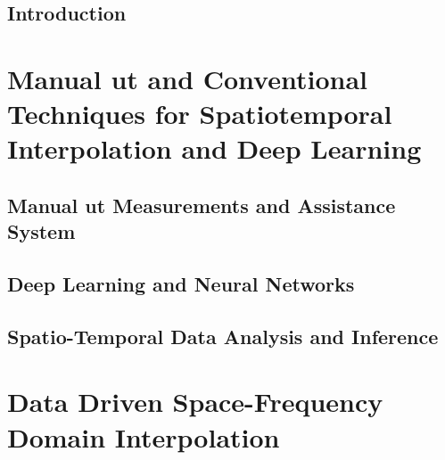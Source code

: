 \documentclass[		a4paper,
								oneside,
								11pt,
								headinclude,
								BCOR=17mm,        %
								headsepline,     %
								footsepline,
								]{scrreprt}%
\begin{document}

 


\tableofcontents 
{}

\listoffigures
{}
\listoftables
{}

\newpage %
\setcounter{page}{1} 



\chapter{Introduction} \label{chap:intro}


\part[Data Model and SoA]{Manual \acrshort{ut} and Conventional Techniques for Spatiotemporal Interpolation and Deep Learning} \label{part_soa} 
\chapter[UT Data Model]{Manual \acrshort{ut} Measurements and Assistance System} \label{chap_ut} 


\chapter[SoA: DL]{Deep Learning and Neural Networks} \label{chap_dl}


\chapter[SoA: ST Interpolation]{Spatio-Temporal Data Analysis and Inference} \label{chap_stitp} 



\part{Data Driven Space-Frequency Domain Interpolation} \label{part_method}  

\end{document}
